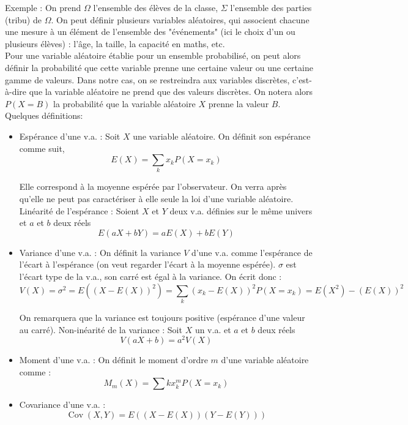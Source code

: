Exemple : On prend \(\Omega\) l'ensemble des élèves de la classe, \(\Sigma\) l'ensemble des parties (tribu) de \(\Omega\). On peut définir plusieurs variables aléatoires, qui associent chacune une mesure à un élément de l'ensemble des "événements" (ici le choix d'un ou plusieurs élèves) : l'âge, la taille, la capacité en maths, etc.\\

Pour une variable aléatoire établie pour un ensemble probabilisé, on peut alors définir la probabilité que cette variable prenne une certaine valeur ou une certaine gamme de valeurs. Dans notre cas, on se restreindra aux variables discrètes, c'est-à-dire que la variable aléatoire ne prend que des valeurs discrètes. On notera alors \(P(X=B)\) la probabilité que la variable aléatoire \(X\) prenne la valeur \(B\). Quelques définitions:

\begin{itemize}
    \item Espérance d'une v.a. : Soit \(X\) une variable aléatoire. On définit son espérance comme suit,
    \[
    E(X)=\sum_{k} x_{k} P\left(X=x_{k}\right)
    \]
    
    Elle correspond à la moyenne espérée par l'observateur. On verra après qu'elle ne peut pas caractériser à elle seule la loi d'une variable aléatoire.
    Linéarité de l'espérance : Soient \(X\) et \(Y\) deux v.a. définies sur le même univers et \(a\) et \(b\) deux réels
    \[
    E(a X+b Y)=a E(X)+b E(Y)
    \]
    \item Variance d'une v.a. : On définit la variance \(V\) d'une v.a. comme l'espérance de l'écart à l'espérance (on veut regarder l'écart à la moyenne espérée). \(\sigma\) est l'écart type de la v.a., son carré est égal à la variance. On écrit donc :
    \[
    V(X)=\sigma^{2}=E\left((X-E(X))^{2}\right)=\sum_{k}\left(x_{k}-E(X)\right)^{2} P\left(X=x_{k}\right)=E\left(X^{2}\right)-(E(X))^{2}
    \]
    
    On remarquera que la variance est toujours positive (espérance d'une valeur au carré).
    Non-inéarité de la variance : Soit \(X\) un v.a. et \(a\) et \(b\) deux réels
    \[
    V(a X+b)=a^{2} V(X)
    \]
    \item Moment d'une v.a. : On définit le moment d'ordre \(m\) d'une variable aléatoire comme :
    \[
    M_{m}(X)=\sum k x_{k}^{m} P\left(X=x_{k}\right)
    \]
    \item Covariance d'une v.a. :
    \[
    \operatorname{Cov}(X, Y)=E((X-E(X))(Y-E(Y)))
    \]
\end{itemize}

